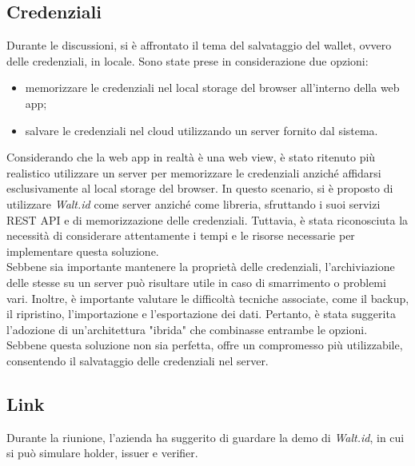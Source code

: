 \subsection{Credenziali}
Durante le discussioni, si è affrontato il tema del salvataggio del wallet, ovvero delle credenziali, in locale. Sono state prese in considerazione due 
opzioni: 
\begin{itemize}
  \item memorizzare le credenziali nel local storage del browser all'interno della web app; 
  \item salvare le credenziali nel cloud utilizzando un server fornito dal sistema. 
\end{itemize} 
Considerando che la web app in realtà è una web view, è stato ritenuto più realistico utilizzare un server per memorizzare le 
credenziali anziché affidarsi esclusivamente al local storage del browser. In questo scenario, si è proposto di utilizzare \textit{Walt.id} 
come server anziché come libreria, sfruttando i suoi servizi REST API e di memorizzazione delle credenziali. Tuttavia, è stata riconosciuta la necessità di considerare attentamente i tempi 
e le risorse necessarie per implementare questa soluzione.\\
Sebbene sia importante mantenere la proprietà delle credenziali, l'archiviazione delle 
stesse su un server può risultare utile in caso di smarrimento o problemi vari. Inoltre, è importante valutare le difficoltà tecniche associate, 
come il backup, il ripristino, l'importazione e l'esportazione dei dati. Pertanto, è stata suggerita l'adozione di un'architettura "ibrida" 
che combinasse entrambe le opzioni. Sebbene questa soluzione non sia perfetta, offre un compromesso più utilizzabile, 
consentendo il salvataggio delle credenziali nel server.

\subsection{Link}
Durante la riunione, l'azienda ha suggerito di guardare la demo di \textit{Walt.id}, in cui si può simulare holder, issuer e verifier.
